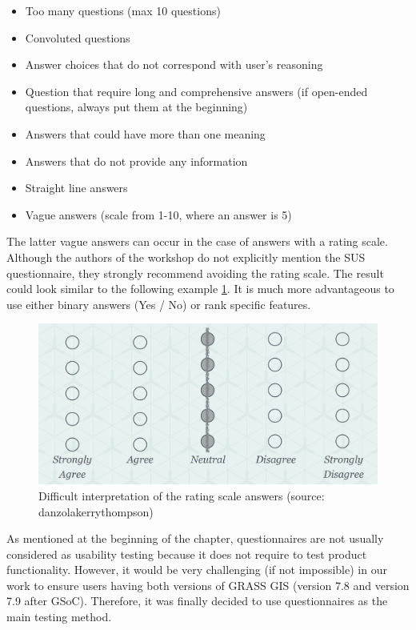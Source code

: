 \documentclass[a4paper,10pt,twoside]{article}
\begin{document}
\begin{itemize}
\item Too many questions (max 10 questions)
\item Convoluted questions
\item Answer choices that do not correspond with user's reasoning
\item Question that require long and comprehensive answers (if open-ended questions, always put them at the beginning)
\item Answers that could have more than one meaning
\item Answers that do not provide any information
\item Straight line answers
\item Vague answers (scale from 1-10, where an answer is 5)
\end{itemize}

\noindent The latter vague answers can occur in the case of answers with a rating scale. Although the authors of the workshop do not explicitly mention the SUS questionnaire, they strongly recommend avoiding the rating scale. The result could look similar to the following example \ref{fig:blur_scale}. It is much more advantageous to use either binary answers (Yes / No) or rank specific features. 

\vspace{0.3cm}
\begin{figure}[hbt!] 
\begin{center}
\includegraphics[width=12.5cm]{../pictures/blur_scale.png} 
\caption[Difficult interpretation of the rating scale answers]{Difficult interpretation of the rating scale answers (source: danzolakerrythompson)}
\label{fig:blur_scale}
\end{center}
\end{figure}

\noindent As mentioned at the beginning of the chapter, questionnaires are not usually considered as usability testing because it does not require to test product functionality.
However, it would be very challenging (if not impossible) in our work to ensure users having both versions of GRASS GIS (version 7.8 and version 7.9 after GSoC). Therefore, it was finally decided to use questionnaires as the main testing method.
\end{document}
